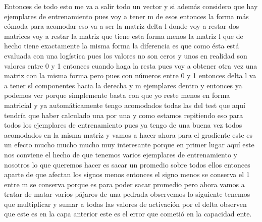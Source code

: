 Entonces de todo esto me va a salir todo un vector y si además considero que hay ejemplares de entrenamiento pues voy a tener m de esos entonces la forma más cómoda para acomodar eso va a ser la matriz delta l donde voy a restar dos matrices voy a restar la matriz que tiene esta forma menos la matriz l que de hecho tiene exactamente la misma forma la diferencia es que como ésta está evaluada con una logística pues los valores no son ceros y unos en realidad son valores entre 0 y 1 entonces cuando haga la resta pues voy a obtener otra vez una matriz con la misma forma pero pues con números entre 0 y 1 entonces delta l va a tener sl componentes hacia la derecha y m ejemplares dentro y entonces ya podemos ver porque simplemente basta con que yo reste menos en forma matricial y ya automáticamente tengo acomodados todas las del test que aquí tendría que haber calculado una por una y como estamos repitiendo eso para todos los ejemplares de entrenamiento pues ya tengo de una buena vez todos acomodados en la misma matriz y vamos a hacer ahora para el gradiente este es un efecto mucho mucho mucho muy interesante porque en primer lugar aquí este nos conviene el hecho de que tenemos varios ejemplares de entrenamiento y nosotros lo que queremos hacer es sacar un promedio sobre todos ellos entonces aparte de que afectan los signos menos entonces el signo menos se conserva el 1 entre m se conserva porque es para poder sacar promedio pero ahora vamos a tratar de matar varios pájaros de una pedrada observemos lo siguiente tenemos que multiplicar y sumar a todas las valores de activación por el delta observen que este es en la capa anterior este es el error que cometió en la capacidad ente. 

